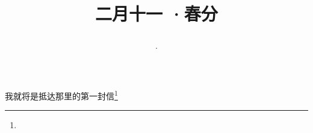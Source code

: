 \title{\date[d=20,m=3,y=2024][year:cn-y,年,month:cn,day:cn,日,·,weekday]·二月十一 ·春分}
我就将是抵达那里的第一封信\footnote{ }

